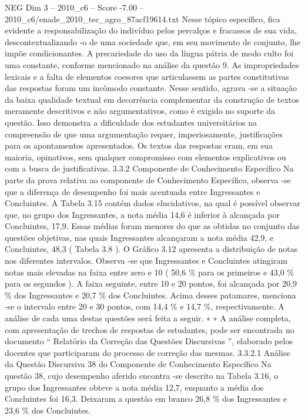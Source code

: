 \begin{textsample}{NEG Dim 3 – 2010\_c6 – Score -7.00 – 2010\_c6/enade\_2010\_tec\_agro\_87acf19614.txt}
Nesse tópico específico, fica evidente a responsabilização do indivíduo pelos percalços e fracassos de sua vida, descontextualizando -o de uma sociedade que, em seu movimento de conjunto, lhe impõe condicionantes.
A precariedade do uso da língua pátria de modo culto foi uma constante, conforme mencionado na análise da questão 9.
As impropriedades lexicais e a falta de elementos coesores que articulassem as partes constitutivas das respostas foram um incômodo constante.
Nesse sentido, agrava -se a situação da baixa qualidade textual em decorrência complementar da construção de textos meramente descritivos e não argumentativos, como é exigido no suporte da questão.
Isso demonstra a dificuldade dos estudantes universitários na compreensão de que uma argumentação requer, imperiosamente, justificações para os apontamentos apresentados.
Os textos das respostas eram, em sua maioria, opinativos, sem qualquer compromisso com elementos explicativos ou com a busca de justificativas. 3.3.2 Componente de Conhecimento Específico Na parte da prova relativa ao componente de Conhecimento Específico, observa -se que a diferença de desempenho foi mais acentuada entre Ingressantes e Concluintes.
A Tabela 3.15 contém dados elucidativos, na qual é possível observar que, no grupo dos Ingressantes, a nota média 14,6 é inferior à alcançada por Concluintes, 17,9.
Essas médias foram menores do que as obtidas no conjunto das questões objetivas, nas quais Ingressantes alcançaram a nota média 42,9, e Concluintes, 48,3 ( Tabela 3.8 ).
O Gráfico 3.12 apresenta a distribuição de notas nos diferentes intervalos.
Observa -se que Ingressantes e Concluintes atingiram notas mais elevadas na faixa entre zero e 10 ( 50,6 \% para os primeiros e 43,0 \% para os segundos ).
A faixa seguinte, entre 10 e 20 pontos, foi alcançada por 20,9 \% dos Ingressantes e 20,7 \% dos Concluintes.
Acima desses patamares, menciona -se o intervalo entre 20 e 30 pontos, com 14,4 \% e 14,7 \%, respectivamente.
A análise de cada uma destas questões será feita a seguir. ∗ ∗ A análise completa, com apresentação de trechos de respostas de estudantes, pode ser encontrada no documento “ Relatório da Correção das Questões Discursivas ”, elaborado pelos docentes que participaram do processo de correção das mesmas. 3.3.2.1 Análise da Questão Discursiva 38 do Componente de Conhecimento Específico Na questão 38, cujo desempenho aferido encontra -se descrito na Tabela 3.16, o grupo dos Ingressantes obteve a nota média 12,7, enquanto a média dos Concluintes foi 16,3.
Deixaram a questão em branco 26,8 \% dos Ingressantes e 23,6 \% dos Concluintes.

\end{textsample}
